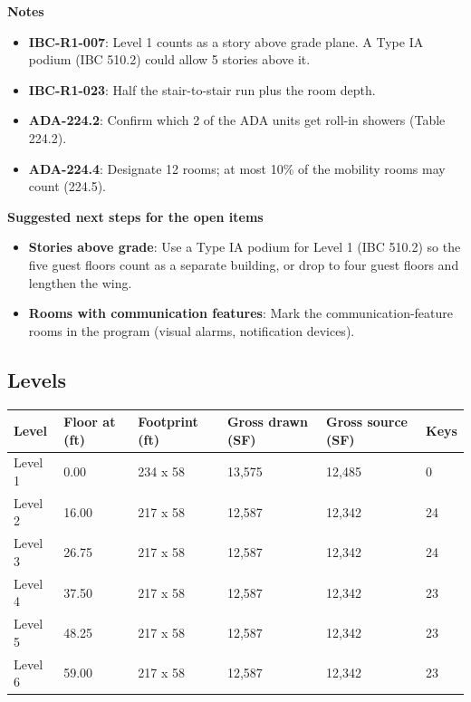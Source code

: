 \documentclass[10pt]{article}
\begin{document}
\textbf{Notes}\begin{itemize}\item \textbf{IBC-R1-007}: Level 1 counts as a story above grade plane. A Type IA podium (IBC 510.2) could allow 5 stories above it.\item \textbf{IBC-R1-023}: Half the stair-to-stair run plus the room depth.\item \textbf{ADA-224.2}: Confirm which 2 of the ADA units get roll-in showers (Table 224.2).\item \textbf{ADA-224.4}: Designate 12 rooms; at most 10\% of the mobility rooms may count (224.5).\end{itemize}
\textbf{Suggested next steps for the open items}\begin{itemize}\item \textbf{Stories above grade}: Use a Type IA podium for Level 1 (IBC 510.2) so the five guest floors count as a separate building, or drop to four guest floors and lengthen the wing.\item \textbf{Rooms with communication features}: Mark the communication-feature rooms in the program (visual alarms, notification devices).\end{itemize}

\subsection{Levels}
{\small \begin{longtable}{p{2cm}p{2cm}p{2.6cm}p{2.8cm}p{2.8cm}p{1.2cm}}
\toprule
\textbf{Level} & \textbf{Floor at (ft)} & \textbf{Footprint (ft)} & \textbf{Gross drawn (SF)} & \textbf{Gross source (SF)} & \textbf{Keys} \\ \midrule \endhead
Level 1 & 0.00 & 234 x 58 & 13,575 & 12,485 & 0 \\
Level 2 & 16.00 & 217 x 58 & 12,587 & 12,342 & 24 \\
Level 3 & 26.75 & 217 x 58 & 12,587 & 12,342 & 24 \\
Level 4 & 37.50 & 217 x 58 & 12,587 & 12,342 & 23 \\
Level 5 & 48.25 & 217 x 58 & 12,587 & 12,342 & 23 \\
Level 6 & 59.00 & 217 x 58 & 12,587 & 12,342 & 23 \\
\bottomrule
\end{longtable}}
\end{document}
